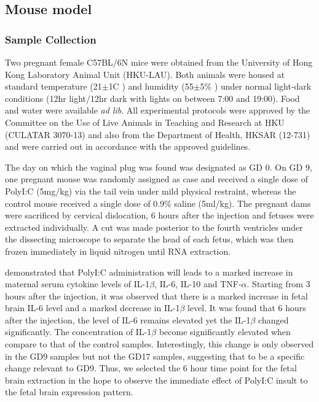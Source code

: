 %

\subsection{Mouse model}
\subsubsection{Sample Collection}
Two pregnant female C57BL/6N mice were obtained from the University of Hong Kong Laboratory Animal Unit (HKU-LAU).
Both animals were housed at standard temperature (21$\pm$1\degree C ) and humidity (55$\pm$5$\%$ ) under normal light-dark conditions (12hr light/12hr dark with lights on between 7:00 and 19:00).
Food and water were available \textit{ad lib}.
All experimental protocols were approved by the Committee on the Use of Live Animals in Teaching and Research at HKU (CULATAR 3070-13) and also from the Department of Health, HKSAR (12-731) and were carried out in accordance with the approved guidelines. 

The day on which the vaginal plug was found was designated as GD 0.
On GD 9, one pregnant mouse was randomly assigned as case and received a single dose of PolyI:C (5mg/kg) via the tail vein under mild physical restraint, whereas the control mouse received a single dose of 0.9$\%$ saline (5ml/kg)\cite{Li2009c}.
The pregnant dams were sacrificed by cervical dislocation, 6 hours after the injection and fetuses were extracted individually.
A cut was made posterior to the fourth ventricles under the dissecting microscope to separate the head of each fetus\cite{Mason1993a}, which was then frozen immediately in liquid nitrogen until RNA extraction. 


\citet{Meyer2006} demonstrated that PolyI:C administration will leads to a marked increase in maternal serum cytokine levels of IL-1$\beta$, IL-6, IL-10 and TNF-$\alpha$.
Starting from 3 hours after the injection, it was observed that there is a marked increase in fetal brain IL-6 level and a marked decrease in IL-1$\beta$ level. 
It was found that 6 hours after the injection, the level of IL-6 remains elevated yet the IL-1$\beta$ changed significantly.
The concentration of IL-1$\beta$ become significantly elevated when compare to that of the control samples.
Interestingly, this change is only observed in the GD9 samples but not the GD17 samples, suggesting that to be a specific change relevant to GD9.
Thus, we selected the 6 hour time point for the fetal brain extraction in the hope to observe the immediate effect of PolyI:C insult to the fetal brain expression pattern.

